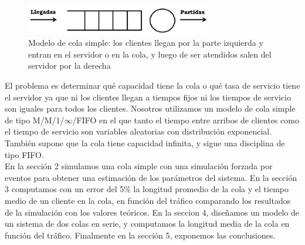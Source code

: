 \documentclass[10pt,journal,compsoc]{IEEEtran}
\begin{document}
\begin{figure}[t] %
\label{fig:colasimple}
\begin{center}
\centering
\includegraphics[width=3.2in]{cola2}
\caption{Modelo de cola simple: los clientes llegan por la parte izquierda y entran en el servidor o en la cola, y luego de ser atendidos salen del servidor por la derecha}
\end{center}
\end{figure}

El problema es determinar qu\'e capacidad tiene la cola o qu\'e tasa de servicio tiene el servidor ya
que ni los clientes llegan a tiempos fijos ni los tiempos de servicio son iguales para todos los
clientes. Nosotros utilizamos un modelo de cola simple de tipo M/M/1/$\infty$/FIFO en el que tanto el
tiempo entre arribos de clientes como el tiempo de servicio son variables aleatorias con distribuci\'on
exponencial. Tambi\'en supone que la cola tiene capacidad infinita, y sigue una disciplina de tipo FIFO.\\
En la secci\'on 2 simulamos una cola simple con una simulaci\'on forzada por eventos para obtener una
estimaci\'on de los par\'ametros del sistema. En la secci\'on 3 computamos con un error del 5\% la longitud
promedio de la cola y el tiempo medio de un cliente en la cola, en funci\'on del tr\'afico comparando los
resultados de la simulaci\'on con los valores te\'oricos. En la seccion 4, dise\~namos un modelo
de un sistema de dos colas en serie, y computamos la longitud media de la cola en funci\'on del tr\'afico.
Finalmente en la secci\'on 5, exponemos las conclusiones.


\end{document}
